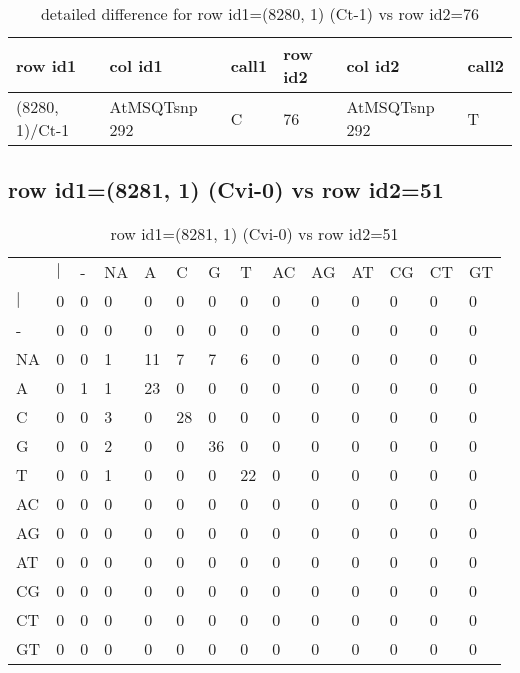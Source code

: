 \begin{center}
\begin{longtable}{|l|l|l|l|l|l|}
\caption{detailed difference for row id1=(8280, 1) (Ct-1) vs row id2=76} \label{table_dm443}\\
\hline
row id1&col id1&call1&row id2&col id2&call2\\
\hline
(8280, 1)/Ct-1&AtMSQTsnp 292&C&76&AtMSQTsnp 292&T\\
\hline
\end{longtable}
\end{center}

\subsection{row id1=(8281, 1) (Cvi-0) vs row id2=51}
\begin{center}
\begin{longtable}{|l|l|l|l|l|l|l|l|l|l|l|l|l|l|}
\caption{row id1=(8281, 1) (Cvi-0) vs row id2=51} \label{table_dm444}\\
\hline
\\
\hline
&$|$&-&NA&A&C&G&T&AC&AG&AT&CG&CT&GT\\
$|$&0&0&0&0&0&0&0&0&0&0&0&0&0\\
-&0&0&0&0&0&0&0&0&0&0&0&0&0\\
NA&0&0&1&11&7&7&6&0&0&0&0&0&0\\
A&0&1&1&23&0&0&0&0&0&0&0&0&0\\
C&0&0&3&0&28&0&0&0&0&0&0&0&0\\
G&0&0&2&0&0&36&0&0&0&0&0&0&0\\
T&0&0&1&0&0&0&22&0&0&0&0&0&0\\
AC&0&0&0&0&0&0&0&0&0&0&0&0&0\\
AG&0&0&0&0&0&0&0&0&0&0&0&0&0\\
AT&0&0&0&0&0&0&0&0&0&0&0&0&0\\
CG&0&0&0&0&0&0&0&0&0&0&0&0&0\\
CT&0&0&0&0&0&0&0&0&0&0&0&0&0\\
GT&0&0&0&0&0&0&0&0&0&0&0&0&0\\
\hline
\end{longtable}
\end{center}

